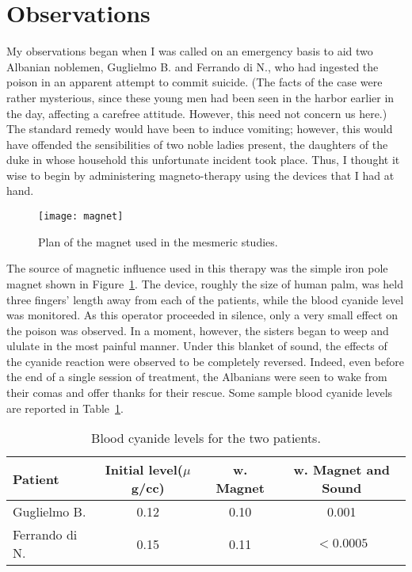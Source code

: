 \documentclass[12pt]{article}
\begin{document}
\section{Observations}

My observations began when I was called on an emergency basis to aid two
Albanian noblemen, Guglielmo B. and Ferrando di N., who had
ingested the poison in an apparent attempt to commit suicide.  (The facts
of the case were rather mysterious, since these young men had been seen in the 
harbor earlier in the day, affecting a carefree attitude.  However, this 
need not concern us here.)  The standard remedy would have been to induce
vomiting; however, this would have offended the 
sensibilities   of two 
noble ladies present, the daughters of the duke in whose household this 
unfortunate incident took place.  Thus, I thought it wise to begin by 
administering magneto-therapy using the devices that I had at hand.

\begin{figure}[htb]
\centering
\texttt{[image: magnet]}
\caption{Plan of the magnet used in the mesmeric studies.}
\label{fig:magnet}
\end{figure}

The source of magnetic influence used in this therapy was the simple
iron pole magnet shown in Figure~\ref{fig:magnet}.  The device, roughly
the size of human palm, was held three fingers' length away from each
of the patients, while the blood cyanide level was monitored.  As this 
operator proceeded in silence, only a very small effect on the poison was
observed.  In a moment, however, the sisters began to weep and ululate
in the most painful manner.  Under this blanket of sound, the effects of 
the cyanide reaction were observed to be completely reversed.  Indeed,
even before the end of a single session of treatment, the Albanians were
seen to wake from their comas and offer thanks for their rescue.  Some
sample blood cyanide levels are reported in Table~\ref{tab:blood}.



\begin{table}[t]
\begin{center}
\begin{tabular}{l|ccc}  
Patient &  Initial level($\mu$g/cc) &  w. Magnet &  
w. Magnet and Sound \\ \hline
 Guglielmo B.  &   0.12     &     0.10      &     0.001  \\
 Ferrando di N. &  0.15     &     0.11      &  $< 0.0005$ \\ \hline
\end{tabular}
\caption{Blood cyanide levels for the two patients.}
\label{tab:blood}
\end{center}
\end{table}
\end{document}
